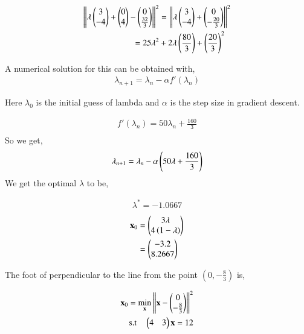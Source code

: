 \documentclass[journal,12pt,twocolumn]{IEEEtran}
\begin{document}
\begin{enumerate}
		\begin{align}
			\left\lVert\lambda \begin{pmatrix}3\\-4\end{pmatrix}+\begin{pmatrix}0\\4\end{pmatrix}-\begin{pmatrix}0\\\frac{32}{3}\end{pmatrix}\right\rVert^2&= \left\lVert\lambda \begin{pmatrix}3\\-4\end{pmatrix}+\begin{pmatrix}0\\-\frac{20}{3}\end{pmatrix}\right\rVert^2\\
			= 25\lambda^2 &+2\lambda \left(\frac{80}{3}\right)+\left(\frac{20}{3}\right)^2
		\end{align}

A numerical solution for this can be obtained with,
		\begin{align}
			\lambda_{n+1} = \lambda_n - \alpha f'(\lambda_n)
		\end{align}

Here $\lambda_0$ is the initial guess of lambda and $\alpha$ is the step size in gradient descent.

		\begin{align}
			f'(\lambda_n) = 50\lambda_n+\frac{160}{3}\\
		\end{align}
So we get,
		\begin{align}
			\lambda_{n+1} = \lambda_n - \alpha \left(50\lambda+\frac{160}{3}\right) 
		\end{align}
We get the optimal $\lambda$ to be,

		\begin{align}
			\lambda^* = -1.0667
		\end{align}
\begin{align}
	\mathbf{x}_0 &= \begin{pmatrix}3\lambda\\4\left(1-\lambda\right)\end{pmatrix}\\
		  &=\begin{pmatrix}-3.2\\8.2667\end{pmatrix}
\end{align}

		\begin{table}[h]
			\centering
			
			\caption{}
			\label{tab:1}
		\end{table}
		
The foot of perpendicular to the line from the point $(0,-\frac{8}{3})$ is,

		\begin{align}
			\mathbf{x}_0 = \min_{\mathbf{x}} \left\lVert\mathbf{x}-\begin{pmatrix}0\\-\frac{8}{3}\end{pmatrix}\right\rVert^2\\
			\text{s.t} \quad \begin{pmatrix}4 & 3\end{pmatrix}\mathbf{x} = 12
		\end{align}


\end{enumerate}
\end{document}
